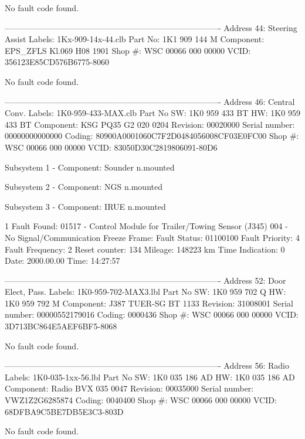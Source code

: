 No fault code found.

-------------------------------------------------------------------------------
Address 44: Steering Assist        Labels: 1Kx-909-14x-44.clb
   Part No: 1K1 909 144 M
   Component: EPS_ZFLS Kl.069 H08 1901  
   Shop #: WSC 00066 000 00000
   VCID: 356123E85CD576B6775-8060

No fault code found.

-------------------------------------------------------------------------------
Address 46: Central Conv.        Labels: 1K0-959-433-MAX.clb
   Part No SW: 1K0 959 433 BT    HW: 1K0 959 433 BT
   Component:    KSG PQ35 G2  020 0204  
   Revision: 00020000    Serial number: 00000000000000
   Coding: 80900A0001060C7F2D0484056008CF03E0FC00
   Shop #: WSC 00066 000 00000
   VCID: 83050D30C2819806091-80D6

   Subsystem 1 - Component:   Sounder n.mounted     

   Subsystem 2 - Component:       NGS n.mounted     

   Subsystem 3 - Component:      IRUE n.mounted     

1 Fault Found:
01517 - Control Module for Trailer/Towing Sensor (J345) 
            004 - No Signal/Communication
             Freeze Frame:
                    Fault Status: 01100100
                    Fault Priority: 4
                    Fault Frequency: 2
                    Reset counter: 134
                    Mileage: 148223 km
                    Time Indication: 0
                    Date: 2000.00.00
                    Time: 14:27:57


-------------------------------------------------------------------------------
Address 52: Door Elect, Pass.        Labels: 1K0-959-702-MAX3.lbl
   Part No SW: 1K0 959 702 Q    HW: 1K0 959 792 M
   Component: J387  TUER-SG BT    1133  
   Revision: 31008001    Serial number: 00000552179016
   Coding: 0000436
   Shop #: WSC 00066 000 00000
   VCID: 3D713BC864E5AEF6BF5-8068

No fault code found.

-------------------------------------------------------------------------------
Address 56: Radio        Labels: 1K0-035-1xx-56.lbl
   Part No SW: 1K0 035 186 AD    HW: 1K0 035 186 AD
   Component: Radio BVX       035 0047  
   Revision: 00035000    Serial number: VWZ1Z2G6285874
   Coding: 0040400
   Shop #: WSC 00066 000 00000
   VCID: 68DFBA9C5BE7DB5E3C3-803D

No fault code found.

